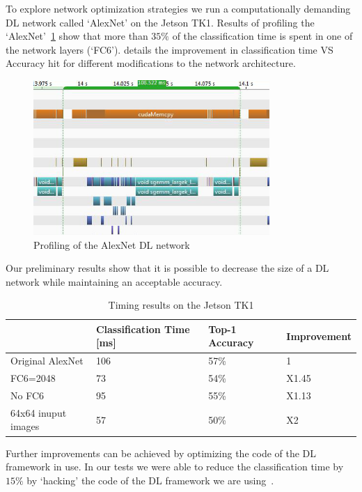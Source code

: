 \documentclass{article} %
\begin{document}
To explore network optimization strategies we run a computationally demanding DL
network called `AlexNet' on the Jetson TK1. Results of profiling the
`AlexNet'~\cref{fig:alex_time} show that more than $35\%$ of the classification
time is spent in one of the network layers (`FC6').  details
the improvement in classification time VS Accuracy hit for different
modifications to the network architecture.
\begin{figure}[h]
	\centering
	\includegraphics[width=0.8\textwidth]{alexnet_time_line_small}
	\caption{Profiling of the AlexNet DL network}
	\label{fig:alex_time}
\end{figure}
Our preliminary results show that it is possible to decrease the size of a DL
network while maintaining an acceptable accuracy.
\begin{table}
	\centering
	\begin{tabular}{ | l | l | l | l | }
		\hline
		                    & Classification Time [ms] & Top-1 Accuracy & Improvement \\ \hline
		Original AlexNet    & 106                      & 57\%           & 1           \\ \hline
		FC6=2048            & 73                       & 54\%           & X1.45       \\ \hline
		No FC6              & 95                       & 55\%           & X1.13       \\ \hline
		64x64 inuput images & 57                       & 50\%           & X2          \\ \hline
	\end{tabular}
	\caption{Timing results on the Jetson TK1}
	\label{tb:alexnet}
\end{table}
Further improvements can be achieved by optimizing the code of the DL framework
in use. In our tests we were able to reduce the classification time by $15\%$ by
`hacking' the code of the DL framework we are using~\cite{jia2014caffe}.
\end{document}
